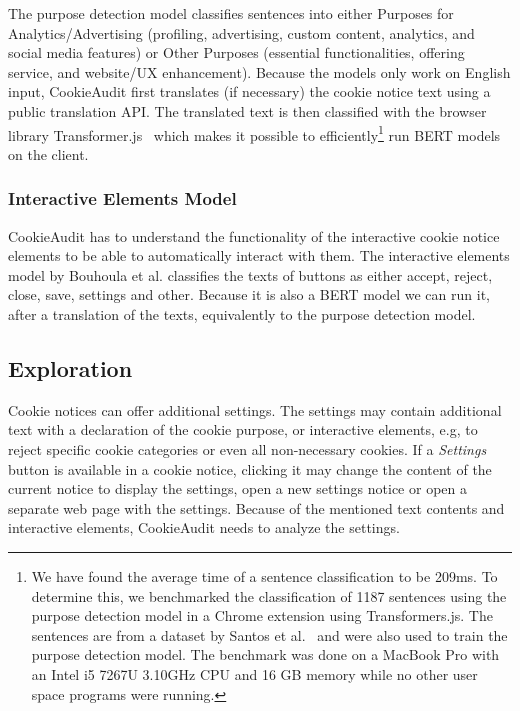 The purpose detection model classifies sentences into either Purposes for Analytics/Advertising (profiling, advertising, custom content, analytics, and social media features) or Other Purposes (essential functionalities, offering service, and website/UX enhancement).
Because the models only work on English input, CookieAudit first translates (if necessary) the cookie notice text using a public translation API.
The translated text is then classified with the browser library Transformer.js~\cite{huggingface2023transformers} which makes it possible to efficiently\footnote{
We have found the average time of a sentence classification to be 209ms. 
To determine this, we benchmarked the classification of 1187 sentences using the purpose detection model in a Chrome extension using Transformers.js.
The sentences are from a dataset by Santos et al.~\cite{santos2021cookie} and were also used to train the purpose detection model.
The benchmark was done on a MacBook Pro with an Intel i5 7267U 3.10GHz CPU and 16 GB memory while no other user space programs were running.
} run BERT models on the client.

\subsubsection{Interactive Elements Model}
CookieAudit has to understand the functionality of the interactive cookie notice elements to be able to automatically interact with them.
The interactive elements model by Bouhoula et al. classifies the texts of buttons as either accept, reject, close, save, settings and other.
Because it is also a BERT model we can run it, after a translation of the texts, equivalently to the purpose detection model.

\subsection{Exploration}
Cookie notices can offer additional settings.
The settings may contain additional text with a declaration of the cookie purpose, or interactive elements, e.g, to reject specific cookie categories or even all non-necessary cookies.
If a \emph{Settings} button is available in a cookie notice, clicking it may change the content of the current notice to display the settings, open a new settings notice or open a separate web page with the settings.
Because of the mentioned text contents and interactive elements, CookieAudit needs to analyze the settings.

